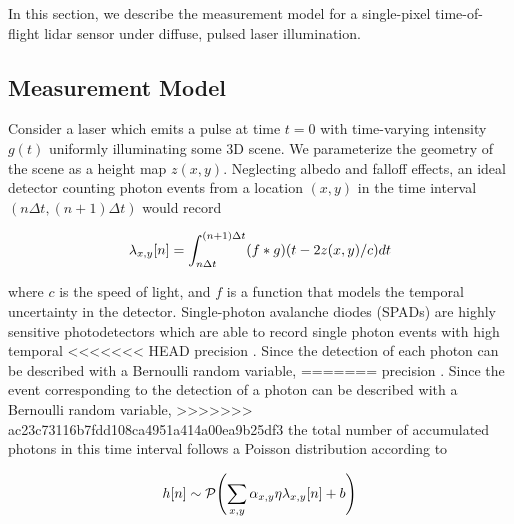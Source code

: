 In this section, we describe the measurement model for a single-pixel
time-of-flight lidar sensor under diffuse, pulsed laser illumination. 
\subsection{Measurement Model}
Consider a laser which emits a pulse at time $t = 0$ with time-varying intensity
$g(t)$ uniformly illuminating some 3D scene. We parameterize the geometry of the
scene as a height map $z(x, y)$.
Neglecting albedo and falloff effects, an ideal detector counting photon events
from a location $(x,y)$ in the time interval $(n\Delta t, (n+1) \Delta t)$ would record

\begin{equation}
  \lambda_{x,y}[n] = \int_{n\Delta t}^{(n+1) \Delta t} (f * g)\paren*{t - 2z(x,y)/c} dt \label{single_loc_spad} 
\end{equation}  

where $c$ is the speed of light, and $f$ is a function that models the temporal uncertainty in the
detector. Single-photon avalanche diodes (SPADs) are highly sensitive
photodetectors which are able to record single photon events with high temporal
<<<<<<< HEAD
precision \cite{Stuff}. Since the detection of each photon can be described with
a Bernoulli random variable,
=======
precision \cite{Stuff}. Since the event corresponding to the detection of a
photon can be described with a Bernoulli random variable,
>>>>>>> ac23c73116b7fdd108ca4951a414a00ea9b25df3
the total number of accumulated photons in this time interval follows a Poisson
distribution according to

\begin{equation}
  h[n] \sim \mathcal{P}\paren*{\sum_{x,y}\alpha_{x,y}\eta \lambda_{x,y}[n] + b} \label{global_hints}
\end{equation}

